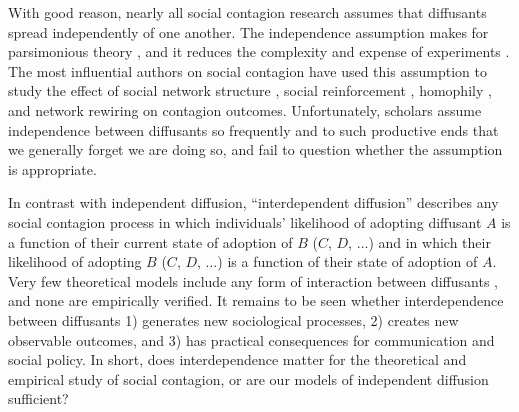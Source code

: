 \documentclass[9pt,twocolumn,twoside,lineno]{pnas-new}
\begin{document}
With good reason, nearly all social contagion research assumes that diffusants spread independently of one another. The independence assumption makes for parsimonious theory \cite{granovetter1973strength, burt1992structural, watts1998collective, watts2011simple, reagans2003network, kempe2003maximizing, lazer2007network, le1897crowd, degroot1974reaching, schelling1978sorting, granovetter1978threshold, centola2007complex, shalizi2011homophily, golub2012homophily, christakis2013social,galam1991towards,hegselmann2002opinion,acemoglu2011opinion}, and it reduces the complexity and expense of experiments \cite{travers2011experimental, kearns2006experimental, suri2011cooperation, salganik2006experimental, lorenz2011social,muchnik2013social, rand2011dynamic,almaatouq2020adaptive}. The most influential authors on social contagion have used this assumption to study the effect of social network structure \cite{granovetter1973strength,burt1992structural,watts1998collective,watts2011simple, reagans2003network,kempe2003maximizing,lazer2007network,travers2011experimental,kearns2006experimental,suri2011cooperation,acemoglu2011opinion}, social reinforcement \cite{le1897crowd,degroot1974reaching,schelling1978sorting,granovetter1978threshold,centola2007complex,salganik2006experimental,lorenz2011social,muchnik2013social,hegselmann2002opinion}, homophily \cite{shalizi2011homophily,golub2012homophily,christakis2013social}, and network rewiring \cite{christakis2013social,rand2011dynamic,almaatouq2020adaptive} on contagion outcomes. Unfortunately, scholars assume independence between diffusants so frequently and to such productive ends that we generally forget we are doing so, and fail to question whether the assumption is appropriate.

In contrast with independent diffusion, “interdependent diffusion” describes any social contagion process in which individuals’ likelihood of adopting diffusant $A$ is a function of their current state of adoption of $B$ ($C$, $D$, $\ldots$) and in which their likelihood of adopting $B$ ($C$, $D$, $\ldots$) is a function of their state of adoption of $A$. Very few theoretical models include any form of interaction between diffusants \cite{baldassarri2007dynamics,dellaposta2015liberals, friedkin2016network, goldberg2018beyond, xiong2017analysis, axelrod-1997-dissemination}, and none are empirically verified. It remains to be seen whether interdependence between diffusants 1) generates new sociological processes, 2) creates new observable outcomes, and 3) has practical consequences for communication and social policy. In short, does interdependence matter for the theoretical and empirical study of social contagion, or are our models of independent diffusion sufficient?
\end{document}
